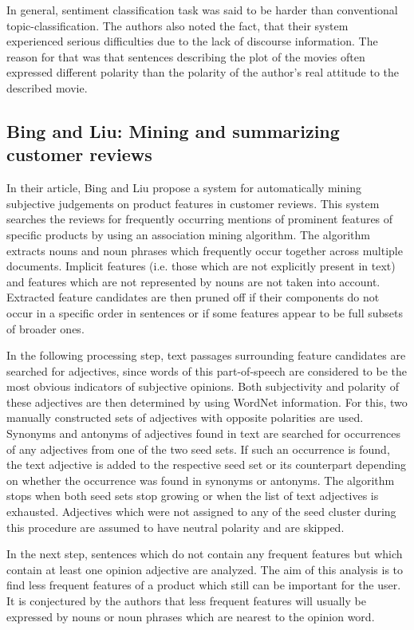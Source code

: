 \documentclass[a4paper,11pt]{article}
\begin{document}
In general, sentiment classification task was said to be harder than
conventional topic-classification.  The authors also noted the fact, that
their system experienced serious difficulties due to the lack of discourse
information.  The reason for that was that sentences describing the plot of
the movies often expressed different polarity than the polarity of the
author's real attitude to the described movie.

\subsection{Bing and Liu: Mining and summarizing customer reviews\cite{Bing-Liu-04}}
In their article, Bing and Liu \cite{Bing-Liu-04} propose a system for
automatically mining subjective judgements on product features in customer
reviews.  This system searches the reviews for frequently occurring mentions
of prominent features of specific products by using an association mining
algorithm.  The algorithm extracts nouns and noun phrases which frequently
occur together across multiple documents.  Implicit features (i.e. those which
are not explicitly present in text) and features which are not represented by
nouns are not taken into account.  Extracted feature candidates are then
pruned off if their components do not occur in a specific order in sentences
or if some features appear to be full subsets of broader ones.

In the following processing step, text passages surrounding feature
candidates are searched for adjectives, since words of this
part-of-speech are considered to be the most obvious indicators of
subjective opinions.  Both subjectivity and polarity of these
adjectives are then determined by using WordNet information.  For
this, two manually constructed sets of adjectives with opposite
polarities are used.  Synonyms and antonyms of adjectives found in
text are searched for occurrences of any adjectives from one of the
two seed sets.  If such an occurrence is found, the text adjective is
added to the respective seed set or its counterpart depending on
whether the occurrence was found in synonyms or antonyms.  The
algorithm stops when both seed sets stop growing or when the list of
text adjectives is exhausted.  Adjectives which were not assigned to
any of the seed cluster during this procedure are assumed to have
neutral polarity and are skipped.

In the next step, sentences which do not contain any frequent features but
which contain at least one opinion adjective are analyzed.  The aim of this
analysis is to find less frequent features of a product which still can be
important for the user.  It is conjectured by the authors that less frequent
features will usually be expressed by nouns or noun phrases which are nearest
to the opinion word.
\end{document}
